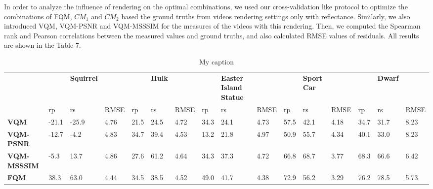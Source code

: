 In order to analyze the influence of rendering on the optimal combinations, we used our cross-validation like protocol to optimize the combinations of FQM, $CM_1$ and $CM_2$ based the ground truths from videos rendering settings only with reflectance. Similarly, we also introduced VQM, VQM-PSNR and VQM-MSSSIM for the measures of the videos with this rendering. Then, we computed the Spearman rank and Pearson correlations between the measured values and ground truths, and also calculated RMSE values of residuals. All results are shown in the Table 7.\\
\begin{table}[]
\centering
\caption{My caption}
\label{my-label}
\begin{tabular}{llllllllllllllll}
                    & \textbf{}     & \textbf{Squirrel} & \textbf{}     & \textbf{}     & \textbf{Hulk} & \textbf{}     & \textbf{}     & \textbf{Easter Island Statue} & \textbf{}     & \textbf{}     & \textbf{Sport Car} & \textbf{}     & \textbf{}     & \textbf{Dwarf} &               \\
                    & rp            & rs                & RMSE          & rp            & rs            & RMSE          & rp            & rs                            & RMSE          & rp            & rs                 & RMSE          & rp            & rs             & RMSE          \\
\textbf{VQM}        & -21.1         & -25.9             & 4.76          & 21.5          & 24.5          & 4.72          & 34.3          & 24.1                          & 4.73          & 57.5          & 42.1               & 4.18          & 34.7          & 31.7           & 8.23          \\
\textbf{VQM-PSNR}   & -12.7         & -4.2              & 4.83          & 34.7          & 39.4          & 4.53          & 13.2          & 21.8                          & 4.97          & 50.9          & 55.7               & 4.34          & 40.1          & 33.0           & 8.23          \\
\textbf{VQM-MSSSIM} & -5.3          & 13.7              & 4.86          & 27.6          & 61.2          & 4.64          & 34.3          & 37.3                          & 4.72          & 66.8          & 68.7               & 3.77          & 68.3          & 66.6           & 6.42          \\
\textbf{FQM}        & 38.3          & 63.0              & 4.44          & 34.5          & 38.5          & 4.52          & 49.0          & 41.7                          & 4.38          & 72.9          & 56.2               & 3.29          & 76.2          & 78.5           & 5.73          \\

\end{tabular}
\end{table}
